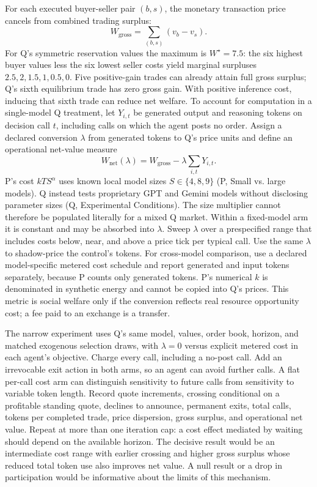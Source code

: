 For each executed buyer-seller pair \((b,s)\), the monetary transaction price
cancels from combined trading surplus:
\[
W_{\mathrm{gross}}=\sum_{(b,s)}(v_b-v_s).
\]
For Q's symmetric reservation values the maximum is \(W^{\star}=7.5\):
the six highest buyer values less the six lowest seller costs yield marginal
surpluses \(2.5,2,1.5,1,0.5,0\). Five positive-gain trades can already attain
full gross surplus; Q's sixth equilibrium trade has zero gross gain. With
positive inference cost, inducing that sixth trade can reduce net welfare.
To account for computation in a single-model Q treatment, let \(Y_{i,t}\)
be generated output and reasoning tokens on decision call \(t\), including
calls on which the agent posts no order. Assign a declared conversion
\(\lambda\) from generated tokens to Q's price units and define an
operational net-value measure
\[
W_{\mathrm{net}}(\lambda)=W_{\mathrm{gross}}
-\lambda\sum_{i,t}Y_{i,t}.
\]
P's cost \(kTS^{\alpha}\) uses known local model sizes
\(S\in\{4,8,9\}\) (P, Small vs. large models). Q instead tests
proprietary GPT and Gemini models without disclosing parameter sizes
(Q, Experimental Conditions). The size multiplier cannot therefore be
populated literally for a mixed Q market. Within a fixed-model arm it is
constant and may be absorbed into \(\lambda\). Sweep \(\lambda\) over a
prespecified range that includes costs below, near, and above a price tick
per typical call. Use the same \(\lambda\) to shadow-price the control's
tokens. For cross-model comparison, use a declared model-specific metered
cost schedule and report generated and input tokens separately, because P
counts only generated tokens. P's numerical \(k\) is denominated in
synthetic energy and cannot be copied into Q's prices. This metric is social
welfare only if the conversion reflects real resource opportunity cost; a
fee paid to an exchange is a transfer.

The narrow experiment uses Q's same model, values, order book, horizon, and
matched exogenous selection draws, with \(\lambda=0\) versus explicit metered cost in each
agent's objective. Charge every call, including a no-post call. Add an
irrevocable exit action in both arms, so an agent can avoid further calls. A
flat per-call cost arm can distinguish sensitivity to future calls from
sensitivity to variable token length. Record quote increments, crossing
conditional on a profitable standing quote, declines to announce, permanent
exits, total calls, tokens per completed trade, price dispersion, gross
surplus, and operational net value. Repeat at more than one iteration cap: a
cost effect mediated by waiting should depend on the available horizon. The
decisive result would be an intermediate cost range with earlier crossing and
higher gross surplus whose reduced total token use also improves net value.
A null result or a drop in participation would be informative about the limits
of this mechanism.


